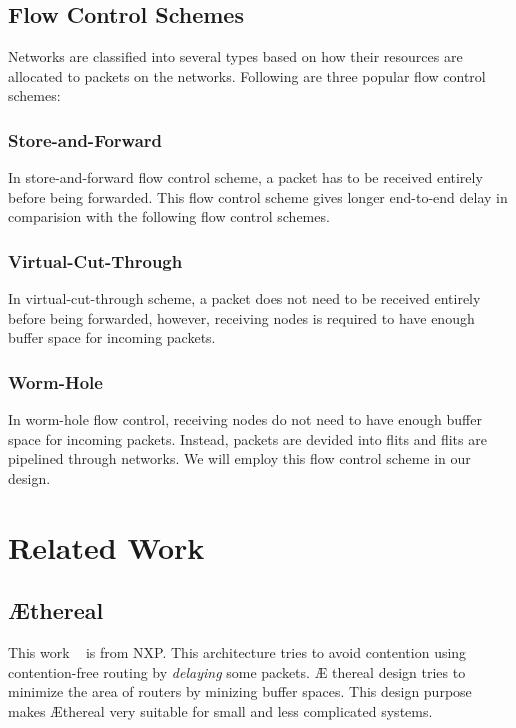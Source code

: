 \documentclass[conference, twocolumn]{IEEEtran}
\theoremstyle{definition}
\begin{document}
\subsection{Flow Control Schemes}
Networks are classified into several types based on how their resources are
allocated to packets on the networks. Following are three popular flow control
schemes:
\subsubsection{Store-and-Forward}
In store-and-forward flow control scheme, a packet has to be received entirely
before being forwarded. This flow control scheme gives longer end-to-end delay
in comparision with the following flow control schemes.
\subsubsection{Virtual-Cut-Through}
In virtual-cut-through scheme, a packet does not need to be received entirely
before being forwarded, however, receiving nodes is required to have enough
buffer space for incoming packets.
\subsubsection{Worm-Hole}
In worm-hole flow control, receiving nodes do not need to have enough buffer
space for incoming packets. Instead, packets are devided into flits and flits
are pipelined through networks. We will employ this flow control scheme in our
design.
\section{Related Work}
\subsection{\AE thereal}
This work ~\cite{Goossens_chapter4} is from NXP. This architecture tries to
avoid contention using contention-free routing by {\em delaying} some packets. \AE
thereal design tries to minimize the area of routers by minizing buffer spaces.
This design purpose makes \AE thereal very suitable for small and less
complicated systems.
\end{document}
